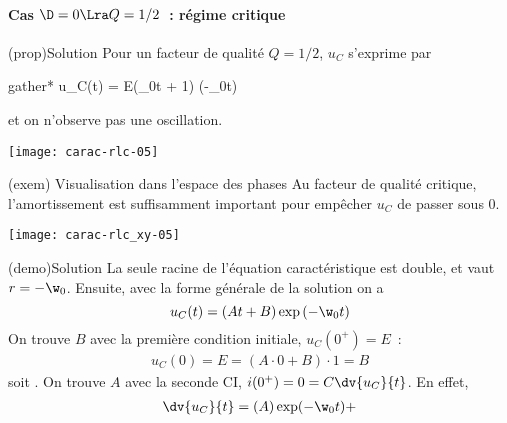 \documentclass[../../main/main.tex]{subfiles}
\begin{document}
\paragraph{Cas $\D = 0 \Lra Q = 1/2$~: régime critique}
\begin{tcbraster}[raster columns=2, raster equal height=rows]

	\begin{tcolorbox}[blankest, raster multicolumn=1, space to=\myspacee]
		\begin{tcbraster}[raster columns=1]
			\begin{tcb}[label=prop:solupseudoper](prop){Solution}
				Pour un facteur de qualité $Q = 1/2$, $u_C$ s'exprime par
				\begin{empheq}[box=\fbox]{gather*}
					u_C(t) = E(\w_0t + 1) \exp(-\w_0t)
				\end{empheq}
				et on n'observe pas une oscillation.
				\tcblower
				\begin{center}
					\texttt{[image: carac-rlc-05]}
				\end{center}
			\end{tcb}
			\begin{tcb}[width=\linewidth, sidebyside](exem)
				{Visualisation dans l'espace des phases}
				Au facteur de qualité critique, l'amortissement est suffisamment important
				pour empêcher $u_C$ de passer sous 0.
				\tcblower
				\begin{center}
					\texttt{[image: carac-rlc\_xy-05]}
				\end{center}
			\end{tcb}
		\end{tcbraster}
	\end{tcolorbox}
	\begin{tcb}[label=demo:solupseudoper](demo){Solution}
		La seule racine de l'équation caractéristique est double, et vaut $r =
			-\w_0$.  Ensuite, avec la forme générale de la
		solution on a
		\begin{equation*}
			u_C(t) = (At+B)\exp \left(-\w_0t\right)
		\end{equation*}
		On trouve $B$ avec la première condition initiale, $u_C(0^+) = E$~:
		\begin{gather*}
			u_C(0) = E = (A\cdot0 + B)\cdot1 = B
		\end{gather*}
		soit \fbox{$B=E$}.
		On trouve $A$ avec la seconde CI, $i(0^+) = 0 = C\dv{u_C}{t}$. En effet,
		\begin{gather*}
			\dv{u_C}{t} = (A)\exp(-\w_0t) +\\

\end{gather*}
\end{tcb}
\end{tcbraster}
\end{document}
